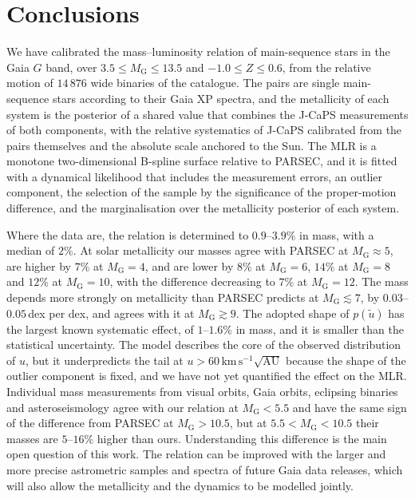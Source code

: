 \documentclass{aa}
\newcommand{\kmsau}{\mathrm{km}\,\mathrm{s}^{-1}\sqrt{\mathrm{AU}}}
\begin{document}
\section{Conclusions}\label{sec:conclusions}
We have calibrated the mass--luminosity relation of main-sequence stars in the Gaia $G$ band, over $3.5\le M_{\mathrm{G}}\le13.5$ and $-1.0\le Z\le0.6$, from the relative motion of $14\,876$ wide binaries of the \citet{ElBadry2021MillionBinaries} catalogue. The pairs are single main-sequence stars according to their Gaia XP spectra, and the metallicity of each system is the posterior of a shared value that combines the J-CaPS measurements of both components, with the relative systematics of J-CaPS calibrated from the pairs themselves and the absolute scale anchored to the Sun. The MLR is a monotone two-dimensional B-spline surface relative to PARSEC, and it is fitted with a dynamical likelihood that includes the measurement errors, an outlier component, the selection of the sample by the significance of the proper-motion difference, and the marginalisation over the metallicity posterior of each system.

Where the data are, the relation is determined to $0.9$--$3.9\%$ in mass, with a median of $2\%$. At solar metallicity our masses agree with PARSEC at $M_{\mathrm{G}}\approx5$, are higher by $7\%$ at $M_{\mathrm{G}}=4$, and are lower by $8\%$ at $M_{\mathrm{G}}=6$, $14\%$ at $M_{\mathrm{G}}=8$ and $12\%$ at $M_{\mathrm{G}}=10$, with the difference decreasing to $7\%$ at $M_{\mathrm{G}}=12$. The mass depends more strongly on metallicity than PARSEC predicts at $M_{\mathrm{G}}\lesssim7$, by $0.03$--$0.05$\,dex per dex, and agrees with it at $M_{\mathrm{G}}\gtrsim9$. The adopted shape of $p(\widetilde u)$ has the largest known systematic effect, of $1$--$1.6\%$ in mass, and it is smaller than the statistical uncertainty. The model describes the core of the observed distribution of $u$, but it underpredicts the tail at $u>60\,\kmsau$ because the shape of the outlier component is fixed, and we have not yet quantified the effect on the MLR. Individual mass measurements from visual orbits, Gaia orbits, eclipsing binaries and asteroseismology agree with our relation at $M_{\mathrm{G}}<5.5$ and have the same sign of the difference from PARSEC at $M_{\mathrm{G}}>10.5$, but at $5.5<M_{\mathrm{G}}<10.5$ their masses are $5$--$16\%$ higher than ours. Understanding this difference is the main open question of this work. The relation can be improved with the larger and more precise astrometric samples and spectra of future Gaia data releases, which will also allow the metallicity and the dynamics to be modelled jointly.
\end{document}
